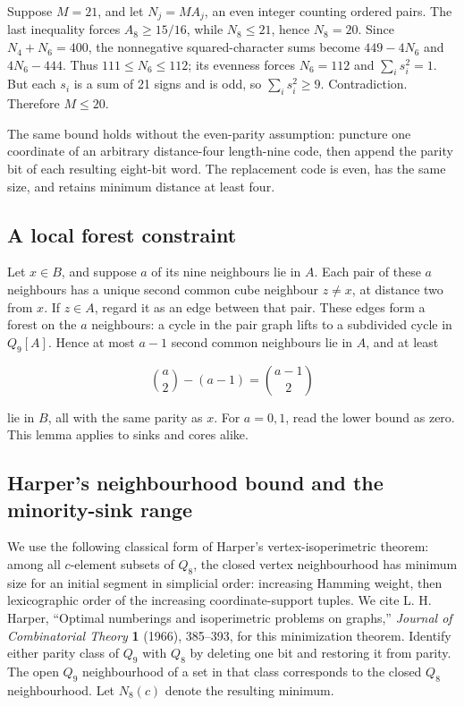 \documentclass[11pt,a4paper]{article}
\begin{document}
Suppose \(M=21\), and let \(N_j=MA_j\), an even integer counting ordered pairs. The last inequality forces \(A_8\ge15/16\), while \(N_8\le21\), hence \(N_8=20\). Since \(N_4+N_6=400\), the nonnegative squared-character sums become \(449-4N_6\) and \(4N_6-444\). Thus \(111\le N_6\le112\); its evenness forces \(N_6=112\) and \(\sum_i s_i^2=1\). But each \(s_i\) is a sum of 21 signs and is odd, so \(\sum_i s_i^2\ge9\). Contradiction. Therefore \(M\le20\).

The same bound holds without the even-parity assumption: puncture one coordinate of an arbitrary distance-four length-nine code, then append the parity bit of each resulting eight-bit word. The replacement code is even, has the same size, and retains minimum distance at least four.

\subsection{A local forest constraint}\label{a-local-forest-constraint}

Let \(x\in B\), and suppose \(a\) of its nine neighbours lie in \(A\). Each pair of these \(a\) neighbours has a unique second common cube neighbour \(z\ne x\), at distance two from \(x\). If \(z\in A\), regard it as an edge between that pair. These edges form a forest on the \(a\) neighbours: a cycle in the pair graph lifts to a subdivided cycle in \(Q_9[A]\). Hence at most \(a-1\) second common neighbours lie in \(A\), and at least

\[
\binom{a}{2}-(a-1)=\binom{a-1}{2} \tag{6}
\]

lie in \(B\), all with the same parity as \(x\). For \(a=0,1\), read the lower bound as zero. This lemma applies to sinks and cores alike.

\subsection{Harper's neighbourhood bound and the minority-sink range}\label{harpers-neighbourhood-bound-and-the-minority-sink-range}

We use the following classical form of Harper's vertex-isoperimetric theorem: among all \(c\)-element subsets of \(Q_8\), the closed vertex neighbourhood has minimum size for an initial segment in simplicial order: increasing Hamming weight, then lexicographic order of the increasing coordinate-support tuples. We cite L. H. Harper, ``Optimal numberings and isoperimetric problems on graphs,'' \emph{Journal of Combinatorial Theory} \textbf{1} (1966), 385--393, for this minimization theorem. Identify either parity class of \(Q_9\) with \(Q_8\) by deleting one bit and restoring it from parity. The open \(Q_9\) neighbourhood of a set in that class corresponds to the closed \(Q_8\) neighbourhood. Let \(N_8(c)\) denote the resulting minimum.
\end{document}
